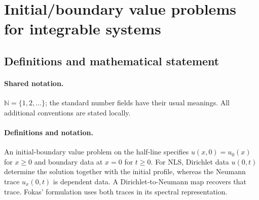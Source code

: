 \documentclass[11pt]{article}
\begin{document}
\section{Initial/boundary value problems for integrable systems}\label{statement}

\subsection{Definitions and mathematical statement}

\paragraph{Shared notation.}$\mathbb N=\{1,2,\ldots\}$; the standard number fields have their usual meanings. All additional conventions are stated locally.


\paragraph{Definitions and notation.}An initial-boundary value problem on the half-line specifies $u(x,0)=u_0(x)$ for $x\ge0$ and boundary data at $x=0$ for $t\ge0$. For NLS, Dirichlet data $u(0,t)$ determine the solution together with the initial profile, whereas the Neumann trace $u_x(0,t)$ is dependent data. A Dirichlet-to-Neumann map recovers that trace. Fokas' formulation uses both traces in its spectral representation.
\end{document}
